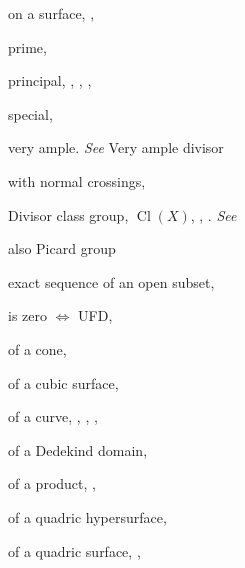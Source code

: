 {{\noindent\hspace*{7.5bp}on a surface, , \par
\noindent\hspace*{7.5bp}prime, \par
\noindent\hspace*{7.5bp}principal, , , , \par
\noindent\hspace*{7.5bp}special, \par
\noindent\hspace*{7.5bp}very ample. \emph{See} Very ample divisor\par
\noindent\hspace*{7.5bp}with normal crossings, \par
\noindent\hspace*{0.0bp}Divisor class group, $\operatorname{Cl}(X)$, , . \emph{See}\par
\noindent\hspace*{15.0bp}also Picard group\par
\noindent\hspace*{7.5bp}exact sequence of an open subset, \par
\noindent\hspace*{7.5bp}is zero $\Leftrightarrow$ UFD, \par
\noindent\hspace*{7.5bp}of a cone, \par
\noindent\hspace*{7.5bp}of a cubic surface, \par
\noindent\hspace*{7.5bp}of a curve, , , , \par
\noindent\hspace*{7.5bp}of a Dedekind domain, \par
\noindent\hspace*{7.5bp}of a product, , \par
\noindent\hspace*{7.5bp}of a quadric hypersurface, \par
\noindent\hspace*{7.5bp}of a quadric surface, , \par
}}
